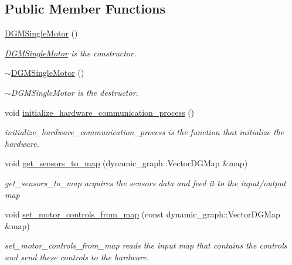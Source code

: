 \subsection*{Public Member Functions}
\begin{DoxyCompactItemize}
\item 
\hyperlink{classdg__blmc__robots_1_1DGMSingleMotor_a3b2a7165e988dd54315ae47fede7f621}{D\+G\+M\+Single\+Motor} ()\hypertarget{classdg__blmc__robots_1_1DGMSingleMotor_a3b2a7165e988dd54315ae47fede7f621}{}\label{classdg__blmc__robots_1_1DGMSingleMotor_a3b2a7165e988dd54315ae47fede7f621}

\begin{DoxyCompactList}\small\item\em \hyperlink{classdg__blmc__robots_1_1DGMSingleMotor}{D\+G\+M\+Single\+Motor} is the constructor. \end{DoxyCompactList}\item 
\hyperlink{classdg__blmc__robots_1_1DGMSingleMotor_affcf3def46050538d1b84f310843a29a}{$\sim$\+D\+G\+M\+Single\+Motor} ()\hypertarget{classdg__blmc__robots_1_1DGMSingleMotor_affcf3def46050538d1b84f310843a29a}{}\label{classdg__blmc__robots_1_1DGMSingleMotor_affcf3def46050538d1b84f310843a29a}

\begin{DoxyCompactList}\small\item\em $\sim$\+D\+G\+M\+Single\+Motor is the destructor. \end{DoxyCompactList}\item 
void \hyperlink{classdg__blmc__robots_1_1DGMSingleMotor_af24b10d315284b3cf36a78155b193001}{initialize\+\_\+hardware\+\_\+communication\+\_\+process} ()\hypertarget{classdg__blmc__robots_1_1DGMSingleMotor_af24b10d315284b3cf36a78155b193001}{}\label{classdg__blmc__robots_1_1DGMSingleMotor_af24b10d315284b3cf36a78155b193001}

\begin{DoxyCompactList}\small\item\em initialize\+\_\+hardware\+\_\+communication\+\_\+process is the function that initialize the hardware. \end{DoxyCompactList}\item 
void \hyperlink{classdg__blmc__robots_1_1DGMSingleMotor_af7af9d26046e101fcdbab65507004a48}{get\+\_\+sensors\+\_\+to\+\_\+map} (dynamic\+\_\+graph\+::\+Vector\+D\+G\+Map \&map)
\begin{DoxyCompactList}\small\item\em get\+\_\+sensors\+\_\+to\+\_\+map acquires the sensors data and feed it to the input/output map \end{DoxyCompactList}\item 
void \hyperlink{classdg__blmc__robots_1_1DGMSingleMotor_a98bc6c87faf9121ef5fa7f1ba421d63e}{set\+\_\+motor\+\_\+controls\+\_\+from\+\_\+map} (const dynamic\+\_\+graph\+::\+Vector\+D\+G\+Map \&map)
\begin{DoxyCompactList}\small\item\em set\+\_\+motor\+\_\+controls\+\_\+from\+\_\+map reads the input map that contains the controls and send these controls to the hardware. \end{DoxyCompactList}\end{DoxyCompactItemize}

